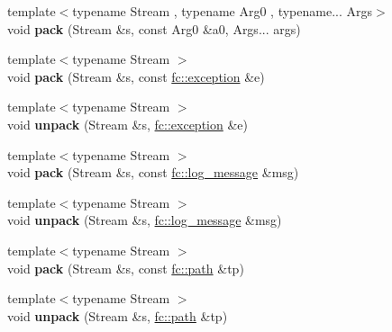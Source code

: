 \begin{DoxyCompactItemize}
\item 
\mbox{\label{namespacefc_1_1raw_ab25172d679b4a35e2aaaf03cb6f24ac6}} 
{\footnotesize template$<$typename Stream , typename Arg0 , typename... Args$>$ }\\void {\bfseries pack} (Stream \&s, const Arg0 \&a0, Args... args)
\item 
\mbox{\label{namespacefc_1_1raw_a65547ee8faeffcae464911cc1e176fab}} 
{\footnotesize template$<$typename Stream $>$ }\\void {\bfseries pack} (Stream \&s, const \mbox{\hyperlink{classfc_1_1exception}{fc\+::exception}} \&e)
\item 
\mbox{\label{namespacefc_1_1raw_acff75d1936f105d332f67018fba1bf87}} 
{\footnotesize template$<$typename Stream $>$ }\\void {\bfseries unpack} (Stream \&s, \mbox{\hyperlink{classfc_1_1exception}{fc\+::exception}} \&e)
\item 
\mbox{\label{namespacefc_1_1raw_a55ba830421d8cde70a3b37bc468d34f7}} 
{\footnotesize template$<$typename Stream $>$ }\\void {\bfseries pack} (Stream \&s, const \mbox{\hyperlink{classfc_1_1log__message}{fc\+::log\+\_\+message}} \&msg)
\item 
\mbox{\label{namespacefc_1_1raw_ad219f4b40c7b9980fd78a0df8bf1db38}} 
{\footnotesize template$<$typename Stream $>$ }\\void {\bfseries unpack} (Stream \&s, \mbox{\hyperlink{classfc_1_1log__message}{fc\+::log\+\_\+message}} \&msg)
\item 
\mbox{\label{namespacefc_1_1raw_a363008130dad99ee5c5669830f122086}} 
{\footnotesize template$<$typename Stream $>$ }\\void {\bfseries pack} (Stream \&s, const \mbox{\hyperlink{classfc_1_1path}{fc\+::path}} \&tp)
\item 
\mbox{\label{namespacefc_1_1raw_a8116fa09e0457b661d102947eee25d04}} 
{\footnotesize template$<$typename Stream $>$ }\\void {\bfseries unpack} (Stream \&s, \mbox{\hyperlink{classfc_1_1path}{fc\+::path}} \&tp)

\end{DoxyCompactItemize}
